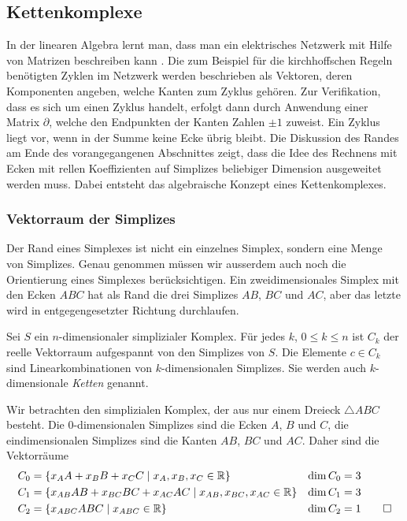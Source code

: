 %
%
\subsection{Kettenkomplexe
\label{buch:topologie:subsection:kettenkomplexe}}
In der linearen Algebra lernt man, dass man ein elektrisches
Netzwerk mit Hilfe von Matrizen beschreiben kann
\cite[Abschnitt~2.A]{buch:linalg}.
Die zum Beispiel für die kirchhoffschen Regeln benötigten Zyklen
im Netzwerk werden beschrieben als Vektoren, deren Komponenten angeben,
welche Kanten zum Zyklus gehören.
Zur Verifikation, dass es sich um einen Zyklus handelt, erfolgt dann
durch Anwendung einer Matrix $\partial$, welche den Endpunkten der
Kanten Zahlen $\pm 1$ zuweist.
Ein Zyklus liegt vor, wenn in der Summe keine Ecke übrig bleibt.
Die Diskussion des Randes am Ende des vorangegangenen Abschnittes
zeigt, dass die Idee des Rechnens mit Ecken mit rellen Koeffizienten 
auf Simplizes beliebiger Dimension ausgeweitet werden muss.
Dabei entsteht das algebraische Konzept eines Kettenkomplexes.

%
%
\subsubsection{Vektorraum der Simplizes}
Der Rand eines Simplexes ist nicht ein einzelnes Simplex, sondern
eine Menge von Simplizes.
Genau genommen müssen wir ausserdem auch noch die Orientierung eines
Simplexes berücksichtigen.
Ein zweidimensionales Simplex mit den Ecken $ABC$ hat als Rand
die drei Simplizes $AB$, $BC$ und $AC$, aber das letzte wird in
entgegengesetzter Richtung durchlaufen.

\begin{definition}
Sei $S$ ein $n$-dimensionaler simplizialer Komplex.
Für jedes $k$, $0\le k\le n$ ist $C_k$ der reelle Vektorraum aufgespannt
von den Simplizes von $S$.
Die Elemente $c\in C_k$ sind Linearkombinationen von $k$-dimensionalen
Simplizes.
Sie werden auch $k$-dimensionale \emph{Ketten} genannt.
%
\end{definition}

\begin{beispiel}
\label{buch:topologie:eulercharakteristik:bsp:dreieck}
Wir betrachten den simplizialen Komplex, der aus nur einem Dreieck
$\triangle ABC$ besteht.
Die $0$-dimensionalen Simplizes sind die Ecken $A$, $B$ und $C$, 
die eindimensionalen Simplizes sind die Kanten $AB$, $BC$ und $AC$.
Daher sind die Vektorräume
\begin{align*}
C_0 &= \{ x_A A + x_B B + x_C C\mid x_A, x_B, x_C\in\mathbb{R}\}
&
\dim C_0 &= 3
\\
C_1 &= \{ x_{AB} AB + x_{BC} BC + x_{AC} AC\mid x_{AB}, x_{BC}, x_{AC} \in\mathbb{R}\}
&
\dim C_1 &= 3
\\
C_2 &= \{ x_{ABC} ABC\mid x_{ABC}\in\mathbb{R}\}
&
\dim C_2 &= 1
\qedhere
\end{align*}
\end{beispiel}

